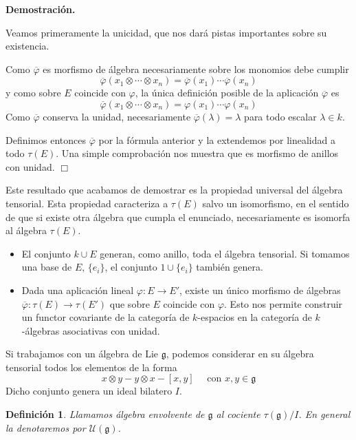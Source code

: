 \documentclass[a4paper,draft,12pt]{article}
\newtheorem{defi}{Definición}[section]%
\newcommand{\dem}{\noindent \textbf{Demostración. }\vspace{0.3 cm}}%
\newcommand{\uni}{\mathcal{U}}%
\newcommand{\fin}{ $\Box $ \vspace{0.4 cm}}
\newcommand{\df}[1]{\textsf{\color{blue}#1}}
\begin{document}
\dem

Veamos primeramente la unicidad, que nos dará pistas importantes sobre su existencia.

Como $\overline{\varphi}$ es morfismo de álgebra necesariamente sobre los monomios debe cumplir
$$
\overline{\varphi}(x_1\otimes \cdots\otimes x_n)= \overline{\varphi}(x_1) \cdots \overline{\varphi}(x_n)
$$
y como sobre $E$ coincide con $\varphi$, la única definición posible de la aplicación $\overline{\varphi}$ es
$$
\overline{\varphi}(x_1\otimes \cdots\otimes x_n)= \varphi(x_1) \cdots \varphi(x_n)
$$
Como $\overline{\varphi}$ conserva la unidad, necesariamente $\overline{\varphi}(\lambda)=\lambda$ para todo escalar $\lambda \in k$.

Definimos entonces $\overline{ \varphi}$ por la fórmula anterior y la extendemos por linealidad a todo $\tau(E)$.  Una simple comprobación nos muestra que es morfismo de anillos con unidad. \fin

Este resultado que acabamos de demostrar es la  \df{propiedad universal} del álgebra tensorial.  Esta propiedad caracteriza a $\tau(E)$ salvo un isomorfismo, en el sentido de que si existe otra álgebra que cumpla el enunciado, necesariamente es isomorfa al álgebra $\tau(E)$.

\bigskip


\begin{itemize}

\item El conjunto $k \cup E$ generan, como anillo, toda el álgebra tensorial.  Si tomamos una base de $E$, $\{e_i\}$, el conjunto $1 \cup \{e_i\}$ también genera.

\item  Dada una aplicación lineal $\varphi: E \rightarrow E'$, existe un único morfismo de álgebras $\overline{\varphi}: \tau(E) \rightarrow \tau(E')$ que sobre $E$ coincide con $\varphi$.  Esto nos permite construir un functor covariante de la categoría de $k$-espacios en la categoría de $k$-álgebras asociativas con unidad.

\end{itemize}


Si trabajamos con un álgebra de Lie $\mathfrak{g}$, podemos considerar en su álgebra tensorial todos los elementos de la forma
$$
x\otimes y - y \otimes x -[x,y] \quad\text{ con } x,y \in \mathfrak{g}
$$
Dicho conjunto genera un ideal bilatero $I$.


\begin{defi}

Llamamos  \df{álgebra envolvente}  de $\mathfrak{g}$ al cociente $\tau(\mathfrak{g})/I$.  En general la denotaremos por $\uni(\mathfrak{g})$.

\end{defi}
\end{document}
